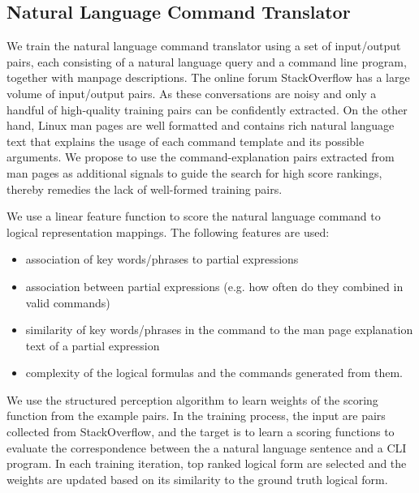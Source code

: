 \subsection{Natural Language Command Translator}
\label{subsec:parser}
We train the natural language command translator using a set of input/output pairs, each consisting of a natural language query and a command line program, together with manpage descriptions. The online forum StackOverflow has a large volume of input/output pairs. As these conversations are noisy and only a handful of high-quality training pairs can be confidently extracted. On the other hand, Linux man pages are well formatted and contains rich natural language text that explains the usage of each command template and its possible arguments. We propose to use the command-explanation pairs extracted from man pages as additional signals to guide the search for high score rankings, thereby remedies the lack of well-formed training pairs.

We use a linear feature function to score the natural language command to logical representation mappings. The following features are used:
\begin{itemize}\itemsep-1pt
	\item association of key words/phrases to partial expressions
	\item association between partial expressions (e.g. how often do they combined in valid commands)
	\item similarity of key words/phrases in the command to the man page explanation text of a partial expression
	\item complexity of the logical formulas and the commands generated from them.
\end{itemize}
We use the structured perception algorithm to learn weights of the scoring function from the example pairs. In the training process, the input are pairs collected from StackOverflow, and the target is to learn a scoring functions to evaluate the correspondence between the a natural language sentence and a CLI program. In each training iteration, top ranked logical form are selected and the weights are updated based on its similarity to the ground truth logical form. 
